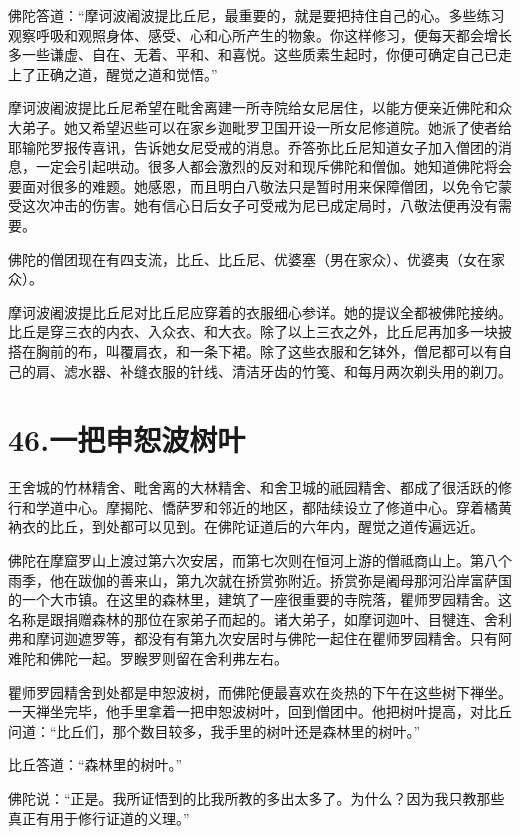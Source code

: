 \documentclass[12pt,twoside,openany]{book}
\begin{document}
佛陀答道：“摩诃波阇波提比丘尼，最重要的，就是要把持住自己的心。多些练习观察呼吸和观照身体、感受、心和心所产生的物象。你这样修习，便每天都会增长多一些谦虚、自在、无着、平和、和喜悦。这些质素生起时，你便可确定自己已走上了正确之道，醒觉之道和觉悟。”

摩诃波阇波提比丘尼希望在毗舍离建一所寺院给女尼居住，以能方便亲近佛陀和众大弟子。她又希望迟些可以在家乡迦毗罗卫国开设一所女尼修道院。她派了使者给耶输陀罗报传喜讯，告诉她女尼受戒的消息。乔答弥比丘尼知道女子加入僧团的消息，一定会引起哄动。很多人都会激烈的反对和现斥佛陀和僧伽。她知道佛陀将会要面对很多的难题。她感恩，而且明白八敬法只是暂时用来保障僧团，以免令它蒙受这次冲击的伤害。她有信心日后女子可受戒为尼已成定局时，八敬法便再没有需要。

佛陀的僧团现在有四支流，比丘、比丘尼、优婆塞（男在家众）、优婆夷（女在家众）。

摩诃波阇波提比丘尼对比丘尼应穿着的衣服细心参详。她的提议全都被佛陀接纳。比丘是穿三衣的内衣、入众衣、和大衣。除了以上三衣之外，比丘尼再加多一块披搭在胸前的布，叫覆肩衣，和一条下裙。除了这些衣服和乞钵外，僧尼都可以有自己的肩、滤水器、补缝衣服的针线、清洁牙齿的竹笺、和每月两次剃头用的剃刀。


\chapter{46.一把申恕波树叶}\label{ch46}

王舍城的竹林精舍、毗舍离的大林精舍、和舍卫城的祇园精舍、都成了很活跃的修行和学道中心。摩揭陀、憍萨罗和邻近的地区，都陆续设立了修道中心。穿着橘黄衲衣的比丘，到处都可以见到。在佛陀证道后的六年内，醒觉之道传遍远近。

佛陀在摩窟罗山上渡过第六次安居，而第七次则在恒河上游的僧祗商山上。第八个雨季，他在跋伽的善来山，第九次就在挢赏弥附近。挢赏弥是阇母那河沿岸富萨国的一个大市镇。在这里的森林里，建筑了一座很重要的寺院落，瞿师罗园精舍。这名称是跟捐赠森林的那位在家弟子而起的。诸大弟子，如摩诃迦叶、目犍连、舍利弗和摩诃迦遮罗等，都没有有第九次安居时与佛陀一起住在瞿师罗园精舍。只有阿难陀和佛陀一起。罗睺罗则留在舍利弗左右。

瞿师罗园精舍到处都是申恕波树，而佛陀便最喜欢在炎热的下午在这些树下禅坐。一天禅坐完毕，他手里拿着一把申恕波树叶，回到僧团中。他把树叶提高，对比丘问道：“比丘们，那个数目较多，我手里的树叶还是森林里的树叶。”

比丘答道：“森林里的树叶。”

佛陀说：“正是。我所证悟到的比我所教的多出太多了。为什么？因为我只教那些真正有用于修行证道的义理。”
\end{document}
